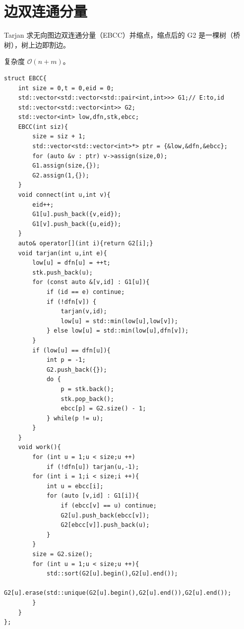 \section{边双连通分量}

Tarjan 求无向图边双连通分量（EBCC）并缩点，缩点后的 G2 是一棵树（桥树），树上边即割边。

复杂度 $\mathcal{O}(n+m)$。

\begin{lstlisting}
struct EBCC{
    int size = 0,t = 0,eid = 0;
    std::vector<std::vector<std::pair<int,int>>> G1;// E:to,id
    std::vector<std::vector<int>> G2;
    std::vector<int> low,dfn,stk,ebcc;
    EBCC(int siz){
        size = siz + 1;
        std::vector<std::vector<int>*> ptr = {&low,&dfn,&ebcc};
        for (auto &v : ptr) v->assign(size,0);
        G1.assign(size,{});
        G2.assign(1,{});
    }
    void connect(int u,int v){
        eid++;
        G1[u].push_back({v,eid});
        G1[v].push_back({u,eid});
    }
    auto& operator[](int i){return G2[i];}
    void tarjan(int u,int e){
        low[u] = dfn[u] = ++t;
        stk.push_back(u);
        for (const auto &[v,id] : G1[u]){
            if (id == e) continue;
            if (!dfn[v]) {
                tarjan(v,id);
                low[u] = std::min(low[u],low[v]);
            } else low[u] = std::min(low[u],dfn[v]);
        }
        if (low[u] == dfn[u]){
            int p = -1;
            G2.push_back({});
            do {
                p = stk.back();
                stk.pop_back();
                ebcc[p] = G2.size() - 1;
            } while(p != u);
        }
    }
    void work(){
        for (int u = 1;u < size;u ++)
            if (!dfn[u]) tarjan(u,-1);
        for (int i = 1;i < size;i ++){
            int u = ebcc[i];
            for (auto [v,id] : G1[i]){
                if (ebcc[v] == u) continue;
                G2[u].push_back(ebcc[v]);
                G2[ebcc[v]].push_back(u);
            }
        }
        size = G2.size();
        for (int u = 1;u < size;u ++){
            std::sort(G2[u].begin(),G2[u].end());
            G2[u].erase(std::unique(G2[u].begin(),G2[u].end()),G2[u].end());
        }
    }
};
\end{lstlisting}

